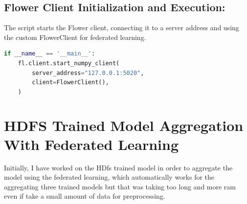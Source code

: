 \documentclass{article}
\begin{document}
\subsection{Flower Client Initialization and Execution:}
The script starts the Flower client, connecting it to a server address and using the custom FlowerClient for federated learning.

\begin{lstlisting}[language=Python]
if __name__ == '__main__':
    fl.client.start_numpy_client(
        server_address="127.0.0.1:5020",
        client=FlowerClient(),
    )
\end{lstlisting}

\section{HDFS Trained Model Aggregation With Federated Learning}
Initially, I have worked on the HDfs trained model in order to aggregate the model using the federated learning, which automatically works for the aggregating three trained models but that was taking too long and more ram even if take a small amount of data for preprocessing.
\end{document}
